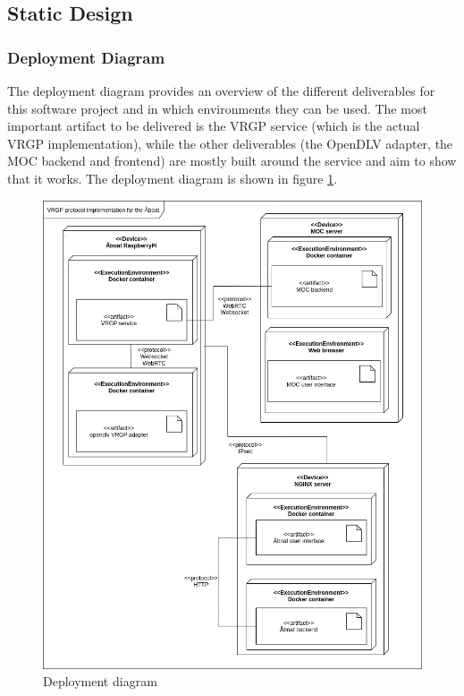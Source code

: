 \subsection{Static Design}

\subsubsection{Deployment Diagram}

The deployment diagram provides an overview of the different deliverables for this software project and in which environments they can be used. The most important artifact to be delivered is the VRGP service (which is the actual VRGP implementation), while the other deliverables (the OpenDLV adapter, the MOC backend and frontend) are mostly built around the service and aim to show that it works. The deployment diagram is shown in figure \ref{fig:deployment-diagram}.

\begin{figure}[ht]
	\centering
	\includegraphics[width=\linewidth]{diagrams/deployment-diagram}
	\caption{Deployment diagram}
	\label{fig:deployment-diagram}
\end{figure}

